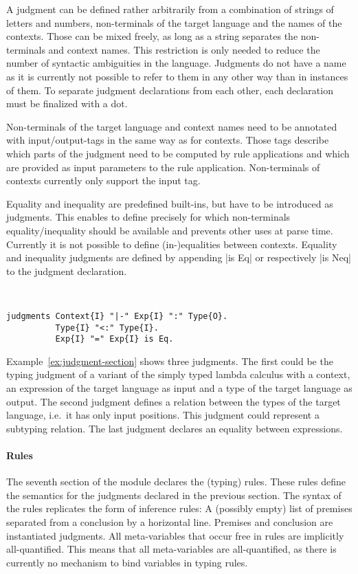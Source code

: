 A judgment can be defined rather arbitrarily from a combination of
strings of letters and numbers, non-terminals of the target language
and the names of the contexts. Those can be mixed freely, as long as a
string separates the non-terminals and context names. This restriction
is only needed to reduce the number of syntactic ambiguities in the
language. Judgments do not have a name as it is currently not possible
to refer to them in any other way than in instances of them. To
separate judgment declarations from each other, each declaration must
be finalized with a dot.

Non-terminals of the target language and context names need to be
annotated with input/output-tags in the same way as for
contexts. Those tags describe which parts of the judgment need to be
computed by rule applications and which are provided as input
parameters to the rule application. Non-terminals of contexts
currently only support the input tag.

Equality and inequality are predefined built-ins, but have to be
introduced as judgments. This enables to define precisely for which
non-terminals equality/inequality should be available and prevents
other uses at parse time. Currently it is not possible to define
(in-)equalities between contexts. Equality and inequality judgments
are defined by appending \code|is Eq| or respectively \code|is Neq| to
the judgment declaration.

\begin{example}{~}
\begin{lstlisting}[language=sltc]
judgments Context{I} "|-" Exp{I} ":" Type{O}.
          Type{I} "<:" Type{I}.
          Exp{I} "=" Exp{I} is Eq.
\end{lstlisting}
\label{ex:judgment-section}
\end{example}

Example~\ref{ex:judgment-section} shows three judgments. The first
could be the typing judgment of a variant of the simply typed lambda
calculus with a context, an expression of the target language as input
and a type of the target language as output. The second judgment
defines a relation between the types of the target language, i.e.\ it
has only input positions. This judgment could represent a subtyping
relation. The last judgment declares an equality between expressions.

\paragraph{Rules} The seventh section of the module declares the
(typing) rules. These rules define the semantics for the judgments
declared in the previous section. The syntax of the rules replicates
the form of inference rules: A (possibly empty) list of premises
separated from a conclusion by a horizontal line. Premises and
conclusion are instantiated judgments. All meta-variables that occur
free in rules are implicitly all-quantified. This means that all
meta-variables are all-quantified, as there is currently no mechanism
to bind variables in typing rules.

